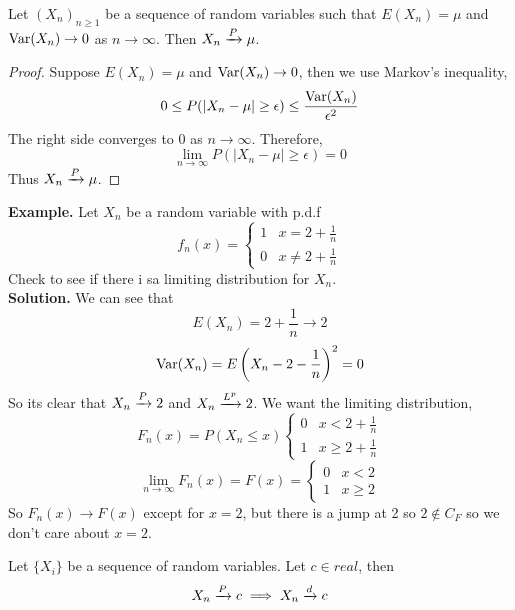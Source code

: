 \documentclass[openany]{report}
\begin{document}
    \begin{theorem}\label{theorem:5.0.1}
        Let $(X_n)_{n\geq 1}$ be a sequence of random variables such that $E(X_n) = \mu$ and $\operatorname{Var}(X_n) \rightarrow 0$ as $n \rightarrow \infty$. Then $X_n \xrightarrow{P} \mu$.
    \end{theorem}
    \begin{proof}
        Suppose $E(X_n) = \mu$ and $\operatorname{Var}(X_n) \rightarrow 0$, then we use Markov's inequality,
        \[0 \leq P(|X_n - \mu| \geq \epsilon) \leq \frac{\operatorname{Var}(X_n)}{\epsilon^2}\]
        The right side converges to 0 as $n \rightarrow \infty$. Therefore,
        \[\lim_{n\rightarrow \infty} P(|X_n - \mu| \geq \epsilon) = 0\]
        Thus $X_n \xrightarrow{P} \mu$. 
    \end{proof}
    \textbf{Example.} Let $X_n$ be a random variable with p.d.f 
    \[f_n(x) = \begin{cases}
        1 & x = 2 + \frac{1}{n}\\
        0 & x \neq 2 + \frac{1}{n}
    \end{cases}\]
    Check to see if there i sa limiting distribution for $X_n$.\\[2ex]
    \textbf{Solution.} We can see that 
    \[E(X_n) = 2 + \frac{1}{n} \rightarrow 2\]
    \[\operatorname{Var}(X_n) = E\left(X_n - 2 - \frac{1}{n}\right)^2 = 0\]
    So its clear that $X_n \xrightarrow{P} 2$ and $X_n \xrightarrow{L^{p}} 2$. We want the limiting distribution,
    \[F_n(x) = P(X_n \leq x) \begin{cases}
        0 & x < 2+\frac{1}{n}\\
        1 & x \geq 2 + \frac{1}{n}
    \end{cases}\] 
    \[\lim_{n\rightarrow \infty}F_n(x) = F(x) = \begin{cases}
        0 & x < 2 \\
        1 & x \geq 2
    \end{cases}\]
    So $F_n(x) \rightarrow F(x)$ except for $x = 2$, but there is a jump at 2 so $2 \not\in C_F$ so we don't care about $x=2$. 
    \begin{theorem}
        Let $\{X_i\}$ be a sequence of random variables. Let $c \in real$, then 
        \[X_n \xrightarrow{P} c \implies X_n \xrightarrow{d} c\]
    \end{theorem}
\end{document}
